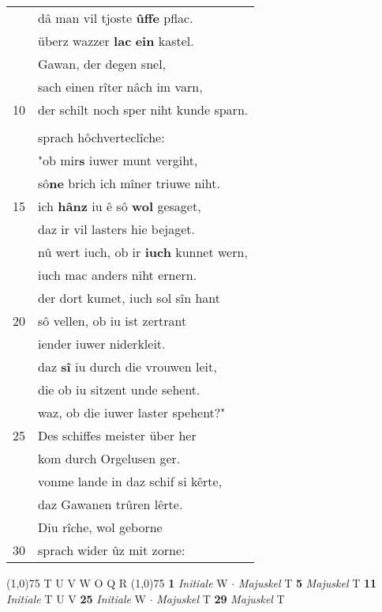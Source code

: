 \documentclass[8pt,a4paper,notitlepage]{article}
\begin{document}
\begin{table}[ht]
\begin{minipage}[t]{0.5\linewidth}
\begin{tabular}{rl}
 & dâ man vil tjoste \textbf{ûffe} pflac.\\ 
 & überz wazzer \textbf{lac} \textbf{ein} kastel.\\ 
 & Gawan, der degen snel,\\ 
 & sach einen rîter nâch im varn,\\ 
10 & der schilt noch sper niht kunde sparn.\\ 
 & \textit{\begin{large}O\end{large}}rgeluse, diu rîche,\\ 
 & sprach hôchverteclîche:\\ 
 & "ob mir\textbf{s} iuwer munt vergiht,\\ 
 & sô\textbf{ne} brich ich mîner triuwe niht.\\ 
15 & ich \textbf{hân}\textbf{z} iu ê sô \textbf{wol} gesaget,\\ 
 & daz ir vil lasters hie bejaget.\\ 
 & nû wert iuch, ob ir \textbf{iuch} kunnet wern,\\ 
 & iuch mac anders niht ernern.\\ 
 & der dort kumet, iuch sol sîn hant\\ 
20 & sô vellen, ob iu ist zertrant\\ 
 & iender iuwer niderkleit.\\ 
 & daz \textbf{sî} iu durch die vrouwen leit,\\ 
 & die ob iu sitzent unde sehent.\\ 
 & waz, ob die iuwer laster spehent?"\\ 
25 & Des schiffes meister über her\\ 
 & kom durch Orgelusen ger.\\ 
 & vonme lande in daz schif si kêrte,\\ 
 & daz Gawanen trûren lêrte.\\ 
 & Diu rîche, wol geborne\\ 
30 & sprach wider ûz mit zorne:\\ 
\end{tabular}
\scriptsize
\line(1,0){75} \newline
T U V W O Q R \newline
\line(1,0){75} \newline
\textbf{1} \textit{Initiale} W   $\cdot$ \textit{Majuskel} T  \textbf{5} \textit{Majuskel} T  \textbf{11} \textit{Initiale} T U V  \textbf{25} \textit{Initiale} W   $\cdot$ \textit{Majuskel} T  \textbf{29} \textit{Majuskel} T  \newline

\end{minipage}
\end{table}
\end{document}
